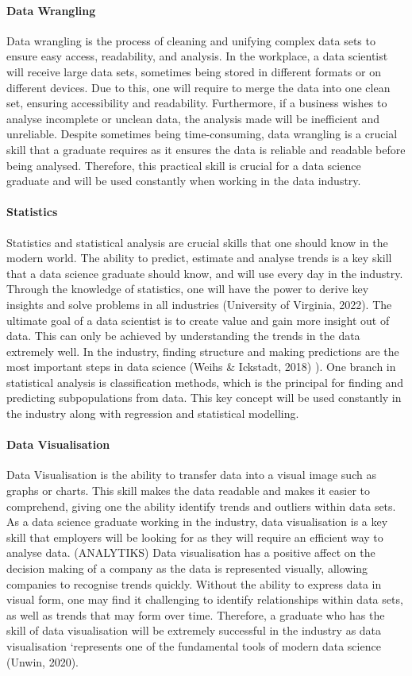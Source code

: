 \documentclass[a4paper, 11pt]{report}
\begin{document}
	\paragraph{Data Wrangling} Data wrangling is the process of cleaning and unifying complex data sets to ensure easy access, readability, and analysis. In the workplace, a data scientist will receive large data sets, sometimes being stored in different formats or on different devices. Due to this, one will require to merge the data into one clean set, ensuring accessibility and readability. Furthermore, if a business wishes to analyse incomplete or unclean data, the analysis made will be inefficient and unreliable. Despite sometimes being time-consuming, data wrangling is a crucial skill that a graduate requires as it ensures the data is reliable and readable before being analysed. Therefore, this practical skill is crucial for a data science graduate and will be used constantly when working in the data industry.

	\paragraph {Statistics} Statistics and statistical analysis are crucial skills that one should know in the modern world. The ability to predict, estimate and analyse trends is a key skill that a data science graduate should know, and will use every day in the industry. Through the knowledge of statistics, one will have the power to derive key insights and solve problems in all industries (University of Virginia, 2022). The ultimate goal of a data scientist is to create value and gain more insight out of data. This can only be achieved by understanding the trends in the data extremely well. In the industry, finding structure and making predictions are the most important steps in data science (Weihs & Ickstadt, 2018)
	). One branch in statistical analysis  is classification methods, which is the principal for finding and predicting subpopulations from data. This key concept will be used constantly in the industry along with regression and statistical modelling.

	\paragraph {Data Visualisation} Data Visualisation is the ability to transfer data into a visual image such as graphs or charts. This skill makes the data readable and makes it easier to comprehend, giving one the ability identify trends and outliers within data sets. As a data science graduate working in the industry, data visualisation is a key skill that employers will be looking for as they will require an efficient way to analyse data. (ANALYTIKS) Data visualisation has a positive affect on the decision making of a company as the data is represented visually, allowing companies to recognise trends quickly. Without the ability to express data in visual form, one may find it challenging to identify relationships within data sets, as well as trends that may form over time. Therefore, a graduate who has the skill of data visualisation will be extremely successful in the industry as data visualisation ‘represents one of the fundamental tools of modern data science (Unwin, 2020).
\end{document}
